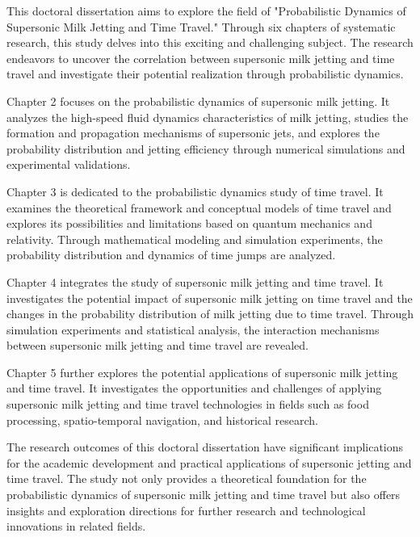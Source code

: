 \begin{englishabstract}

This doctoral dissertation aims to explore the field of "Probabilistic Dynamics of Supersonic Milk Jetting and Time Travel." Through six chapters of systematic research, this study delves into this exciting and challenging subject. The research endeavors to uncover the correlation between supersonic milk jetting and time travel and investigate their potential realization through probabilistic dynamics.

Chapter 2 focuses on the probabilistic dynamics of supersonic milk jetting. It analyzes the high-speed fluid dynamics characteristics of milk jetting, studies the formation and propagation mechanisms of supersonic jets, and explores the probability distribution and jetting efficiency through numerical simulations and experimental validations.

Chapter 3 is dedicated to the probabilistic dynamics study of time travel. It examines the theoretical framework and conceptual models of time travel and explores its possibilities and limitations based on quantum mechanics and relativity. Through mathematical modeling and simulation experiments, the probability distribution and dynamics of time jumps are analyzed.

Chapter 4 integrates the study of supersonic milk jetting and time travel. It investigates the potential impact of supersonic milk jetting on time travel and the changes in the probability distribution of milk jetting due to time travel. Through simulation experiments and statistical analysis, the interaction mechanisms between supersonic milk jetting and time travel are revealed.

Chapter 5 further explores the potential applications of supersonic milk jetting and time travel. It investigates the opportunities and challenges of applying supersonic milk jetting and time travel technologies in fields such as food processing, spatio-temporal navigation, and historical research.

The research outcomes of this doctoral dissertation have significant implications for the academic development and practical applications of supersonic jetting and time travel. The study not only provides a theoretical foundation for the probabilistic dynamics of supersonic milk jetting and time travel but also offers insights and exploration directions for further research and technological innovations in related fields.


\end{englishabstract}